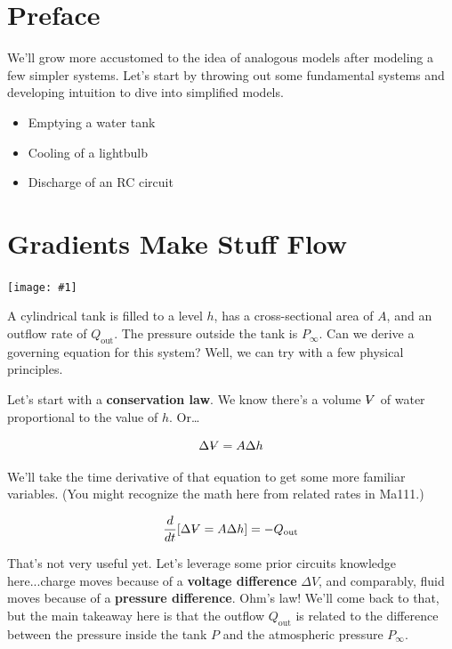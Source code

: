 \documentclass{report}
\newcommand{\Volume}{{\ooalign{\hfil$V$\hfil\cr\kern0.08em--\hfil\cr}}}
\newcommand{\bicture}[1]{
\begin{center}
    {\texttt{[image: \#1]}}
\end{center}}
\begin{document}
\begin{onehalfspacing}
\begin{flushleft}
\section*{Preface}

We'll grow more accustomed to the idea of analogous models after modeling a few simpler systems. Let's start by throwing out some fundamental systems and developing intuition to dive into simplified models.

\begin{itemize}[noitemsep,topsep=0.5pt]
    \item Emptying a water tank
    \item Cooling of a lightbulb
    \item Discharge of an RC circuit
\end{itemize}

\section{Gradients Make Stuff Flow}

\bicture{1_sys1}

A cylindrical tank is filled to a level \(h\), has a cross-sectional area of \(A\), and an outflow rate of \(Q_\text{out}\). The pressure outside the tank is \(P_{\infty}\). Can we derive a governing equation for this system? Well, we can try with a few physical principles.

\medskip

Let's start with a \textbf{conservation law}. We know there's a volume \(\Volume\) of water proportional to the value of \(h\). Or\dots

\vspace{-0.1in}
\[\Delta \Volume = A \Delta h\]

We'll take the time derivative of that equation to get some more familiar variables. (You might recognize the math here from related rates in Ma111.)

\vspace{-0.1in}
\[\frac{d}{dt} \qty[\Delta \Volume = A \Delta h] = -Q_\text{out}\]

That's not very useful yet. Let's leverage some prior circuits knowledge here...charge moves because of a \textbf{voltage difference} \(\Delta V\), and comparably, fluid moves because of a \textbf{pressure difference}. Ohm's law! We'll come back to that, but the main takeaway here is that the outflow \(Q_\text{out}\) is related to the difference between the pressure inside the tank \(P\) and the atmospheric pressure \(P_\infty\).


\end{flushleft}
\end{onehalfspacing}
\end{document}
